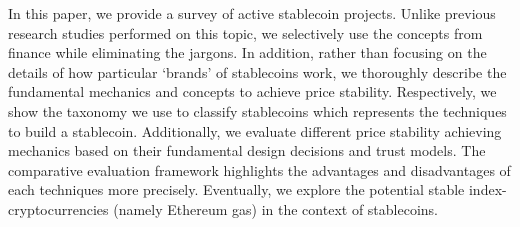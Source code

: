 In this paper, we provide a survey of active stablecoin projects. Unlike previous research studies performed on this topic, we selectively use the concepts from finance while eliminating the jargons. In addition, rather than focusing on the details of how particular `brands' of stablecoins work, we thoroughly describe the fundamental mechanics and concepts to achieve price stability. Respectively, we show the taxonomy we use to classify stablecoins which represents the techniques to build a stablecoin. Additionally, we evaluate different price stability achieving mechanics based on their fundamental design decisions and trust models. The comparative evaluation framework highlights the advantages and disadvantages of each techniques more precisely. Eventually, we explore the potential stable index-cryptocurrencies (namely Ethereum gas) in the context of stablecoins.













